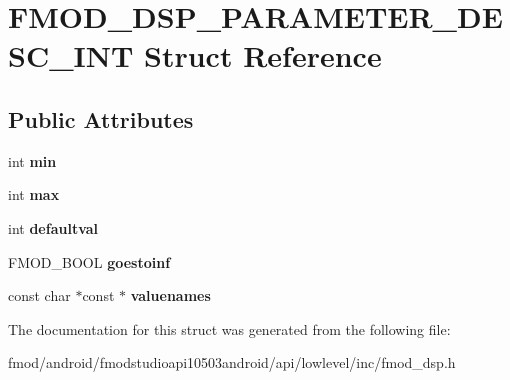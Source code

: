 \hypertarget{struct_f_m_o_d___d_s_p___p_a_r_a_m_e_t_e_r___d_e_s_c___i_n_t}{\section{F\+M\+O\+D\+\_\+\+D\+S\+P\+\_\+\+P\+A\+R\+A\+M\+E\+T\+E\+R\+\_\+\+D\+E\+S\+C\+\_\+\+I\+N\+T Struct Reference}
\label{struct_f_m_o_d___d_s_p___p_a_r_a_m_e_t_e_r___d_e_s_c___i_n_t}
}
\subsection*{Public Attributes}
\begin{DoxyCompactItemize}
\item 
\hypertarget{struct_f_m_o_d___d_s_p___p_a_r_a_m_e_t_e_r___d_e_s_c___i_n_t_a9d7c1b248835dacf48225e3515d7e1ec}{int {\bfseries min}}\label{struct_f_m_o_d___d_s_p___p_a_r_a_m_e_t_e_r___d_e_s_c___i_n_t_a9d7c1b248835dacf48225e3515d7e1ec}

\item 
\hypertarget{struct_f_m_o_d___d_s_p___p_a_r_a_m_e_t_e_r___d_e_s_c___i_n_t_aa88a36d6f2818f8aef53a40720705491}{int {\bfseries max}}\label{struct_f_m_o_d___d_s_p___p_a_r_a_m_e_t_e_r___d_e_s_c___i_n_t_aa88a36d6f2818f8aef53a40720705491}

\item 
\hypertarget{struct_f_m_o_d___d_s_p___p_a_r_a_m_e_t_e_r___d_e_s_c___i_n_t_a49d300c5e15b78a2d6e8a81ece927dba}{int {\bfseries defaultval}}\label{struct_f_m_o_d___d_s_p___p_a_r_a_m_e_t_e_r___d_e_s_c___i_n_t_a49d300c5e15b78a2d6e8a81ece927dba}

\item 
\hypertarget{struct_f_m_o_d___d_s_p___p_a_r_a_m_e_t_e_r___d_e_s_c___i_n_t_ac6ce0578fcab081c13a0b737553cea5c}{F\+M\+O\+D\+\_\+\+B\+O\+O\+L {\bfseries goestoinf}}\label{struct_f_m_o_d___d_s_p___p_a_r_a_m_e_t_e_r___d_e_s_c___i_n_t_ac6ce0578fcab081c13a0b737553cea5c}

\item 
\hypertarget{struct_f_m_o_d___d_s_p___p_a_r_a_m_e_t_e_r___d_e_s_c___i_n_t_a2b9b51af6289b2c4ccb5bfa48150bea9}{const char $\ast$const $\ast$ {\bfseries valuenames}}\label{struct_f_m_o_d___d_s_p___p_a_r_a_m_e_t_e_r___d_e_s_c___i_n_t_a2b9b51af6289b2c4ccb5bfa48150bea9}

\end{DoxyCompactItemize}


The documentation for this struct was generated from the following file\+:\begin{DoxyCompactItemize}
\item 
fmod/android/fmodstudioapi10503android/api/lowlevel/inc/fmod\+\_\+dsp.\+h\end{DoxyCompactItemize}

